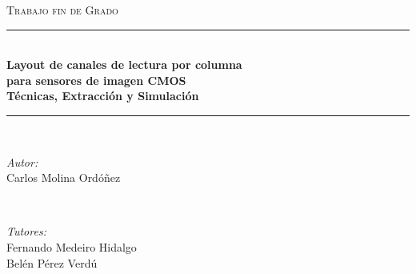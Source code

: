 
\begin{titlepage}

\newcommand{\HRule}{\rule{\linewidth}{0.5mm}} %

\center %


\textsc{\LARGE Trabajo fin de Grado}\\[1.5cm] %






\HRule \\[0.2cm]
{ \large \bfseries Layout de canales de lectura por columna\\[0.1cm]
para sensores de imagen CMOS\\[0.1cm]
Técnicas, Extracción y Simulación}\\[0.2cm]
\HRule \\[2.5cm]


\begin{minipage}{0.4\textwidth}
\begin{flushleft} \large
\emph{Autor:}\\
Carlos Molina Ordóñez
\end{flushleft}
\end{minipage}
~
\begin{minipage}{0.4\textwidth}
\begin{flushright} \large
\emph{Tutores:} \\
Fernando Medeiro Hidalgo \\
Belén Pérez Verdú
\end{flushright}
\end{minipage}\\[2cm]


\end{titlepage}
